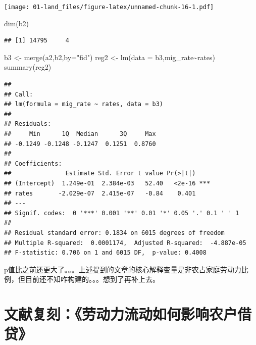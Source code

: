 \documentclass[
  oneside]{book}
\newenvironment{Shaded}{\begin{snugshade}}{\end{snugshade}}
\newcommand{\AttributeTok}[1]{\textcolor[rgb]{0.77,0.63,0.00}{#1}}
\newcommand{\FunctionTok}[1]{\textcolor[rgb]{0.00,0.00,0.00}{#1}}
\newcommand{\NormalTok}[1]{#1}
\newcommand{\OtherTok}[1]{\textcolor[rgb]{0.56,0.35,0.01}{#1}}
\newcommand{\SpecialCharTok}[1]{\textcolor[rgb]{0.00,0.00,0.00}{#1}}
\newcommand{\StringTok}[1]{\textcolor[rgb]{0.31,0.60,0.02}{#1}}
\begin{document}
\texttt{[image: 01-land\_files/figure-latex/unnamed-chunk-16-1.pdf]}

\begin{Shaded}
\begin{Highlighting}[]
\FunctionTok{dim}\NormalTok{(b2)}
\end{Highlighting}
\end{Shaded}

\begin{verbatim}
## [1] 14795     4
\end{verbatim}

\begin{Shaded}
\begin{Highlighting}[]
\NormalTok{b3 }\OtherTok{\textless{}{-}} \FunctionTok{merge}\NormalTok{(a2,b2,}\AttributeTok{by=}\StringTok{"fid"}\NormalTok{)}
\NormalTok{reg2 }\OtherTok{\textless{}{-}} \FunctionTok{lm}\NormalTok{(}\AttributeTok{data =}\NormalTok{ b3,mig\_rate}\SpecialCharTok{\textasciitilde{}}\NormalTok{rates)}
\FunctionTok{summary}\NormalTok{(reg2)}
\end{Highlighting}
\end{Shaded}

\begin{verbatim}
## 
## Call:
## lm(formula = mig_rate ~ rates, data = b3)
## 
## Residuals:
##     Min      1Q  Median      3Q     Max 
## -0.1249 -0.1248 -0.1247  0.1251  0.8760 
## 
## Coefficients:
##               Estimate Std. Error t value Pr(>|t|)    
## (Intercept)  1.249e-01  2.384e-03   52.40   <2e-16 ***
## rates       -2.029e-07  2.415e-07   -0.84    0.401    
## ---
## Signif. codes:  0 '***' 0.001 '**' 0.01 '*' 0.05 '.' 0.1 ' ' 1
## 
## Residual standard error: 0.1834 on 6015 degrees of freedom
## Multiple R-squared:  0.0001174,  Adjusted R-squared:  -4.887e-05 
## F-statistic: 0.706 on 1 and 6015 DF,  p-value: 0.4008
\end{verbatim}

p值比之前还更大了。。。上述提到的文章的核心解释变量是非农占家庭劳动力比例，但目前还不知咋构建的。。。想到了再补上去。

\hypertarget{ux6587ux732eux590dux523bux52b3ux52a8ux529bux6d41ux52a8ux5982ux4f55ux5f71ux54cdux519cux6237ux501fux8d37}{%
\chapter{文献复刻：《劳动力流动如何影响农户借贷》}\label{ux6587ux732eux590dux523bux52b3ux52a8ux529bux6d41ux52a8ux5982ux4f55ux5f71ux54cdux519cux6237ux501fux8d37}}
\end{document}
